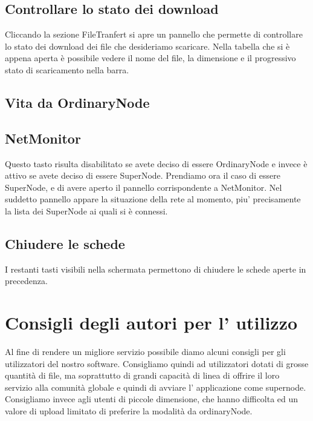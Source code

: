 	\subsection{Controllare lo stato dei download}
Cliccando la sezione FileTranfert si apre un pannello che permette di controllare lo stato dei download dei file che desideriamo scaricare.
Nella tabella che si è appena aperta è possibile vedere il nome del file, la dimensione e il progressivo stato di scaricamento nella barra.
\subsection{Vita da OrdinaryNode}
	\subsection{NetMonitor}
Questo tasto risulta disabilitato se avete deciso di essere OrdinaryNode e invece è attivo se avete deciso di essere SuperNode.
Prendiamo ora il caso di essere SuperNode, e di avere aperto il pannello corrispondente a NetMonitor.
Nel suddetto pannello appare la situazione della rete al momento, piu' precisamente la lista dei SuperNode ai quali si è connessi.


	\subsection{Chiudere le schede}
I restanti tasti visibili nella schermata permettono di chiudere le schede aperte in precedenza.

	\section{Consigli degli autori per l' utilizzo}
Al fine di rendere un migliore servizio possibile diamo alcuni consigli per gli utilizzatori del nostro software.
Consigliamo quindi ad utilizzatori dotati di grosse quantità di file, ma soprattutto di grandi capacità di linea di offrire il loro servizio alla comunità globale e quindi di avviare l' applicazione come supernode.
Consigliamo invece agli utenti di piccole dimensione, che hanno difficolta ed un valore di upload limitato di preferire la modalità da ordinaryNode.
  
